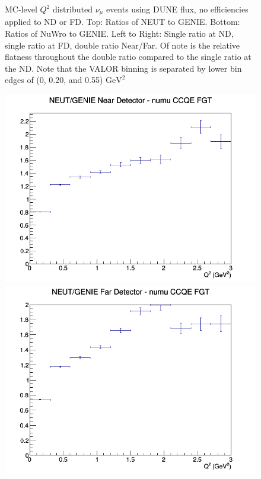 \documentclass[12pt]{article}
\begin{document}
\begin{figure}[h]
\endminipage
\caption{MC-level $Q^2$ distributed $\nu_{\mu}$ events using DUNE flux, no efficiencies applied to ND or FD. Top: Ratios of NEUT to GENIE. Bottom: Ratios of NuWro to GENIE. Left to Right: Single ratio at ND, single ratio at FD, double ratio Near/Far. Of note is the relative flatness throughout the double ratio compared to the single ratio at the ND. Note that the VALOR binning is separated by lower bin edges of (0, 0.20, and 0.55) $\textrm{GeV}^2$}
\label{fig:Q2_ccqe_no_eff}
\end{figure}
\begin{figure}[h]
\includegraphics[width=\linewidth]{eff_Q2/FGT/ratios/CCQE_NEUT_GENIE_numu_near_Q2.png}
\endminipage
{}
\includegraphics[width=\linewidth]{eff_Q2/FGT/ratios/CCQE_NEUT_GENIE_numu_far_Q2.png}

\end{figure}
\end{document}
